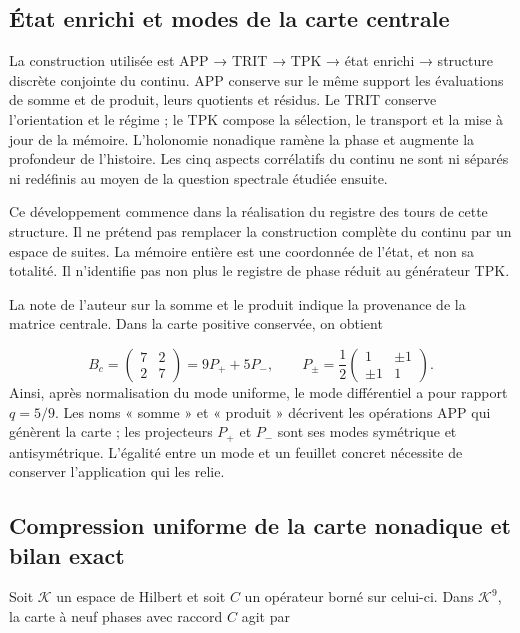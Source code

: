 \subsection{État enrichi et modes de la carte centrale}
\label{viii:tm-add-c1}
La construction utilisée est APP → TRIT → TPK → état enrichi → structure discrète conjointe du continu. APP conserve sur le même support les évaluations de somme et de produit, leurs quotients et résidus. Le TRIT conserve l'orientation et le régime ; le TPK compose la sélection, le transport et la mise à jour de la mémoire. L'holonomie nonadique ramène la phase et augmente la profondeur de l'histoire. Les cinq aspects corrélatifs du continu ne sont ni séparés ni redéfinis au moyen de la question spectrale étudiée ensuite.

Ce développement commence dans la réalisation du registre des tours de cette structure. Il ne prétend pas remplacer la construction complète du continu par un espace de suites. La mémoire entière est une coordonnée de l'état, et non sa totalité. Il n'identifie pas non plus le registre de phase réduit au générateur TPK.

La note de l'auteur sur la somme et le produit indique la provenance de la matrice centrale. Dans la carte positive conservée, on obtient

\[
B_c=\begin{pmatrix}7&2\\2&7\end{pmatrix}
=9P_++5P_-,\qquad
P_\pm=\frac12\begin{pmatrix}1&\pm1\\\pm1&1\end{pmatrix}.
\]
Ainsi, après normalisation du mode uniforme, le mode différentiel a pour rapport \(q=5/9\). Les noms « somme » et « produit » décrivent les opérations APP qui génèrent la carte ; les projecteurs \(P_+\) et \(P_-\) sont ses modes symétrique et antisymétrique. L'égalité entre un mode et un feuillet concret nécessite de conserver l'application qui les relie.


\subsection{Compression uniforme de la carte nonadique et bilan exact}
\label{viii:tm-add-c2}
Soit \(\mathcal K\) un espace de Hilbert et soit \(C\) un opérateur borné sur celui-ci. Dans \(\mathcal K^9\), la carte à neuf phases avec raccord \(C\) agit par

